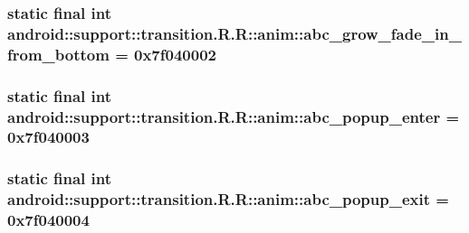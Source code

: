 \hypertarget{classandroid_1_1support_1_1transition_1_1_r_1_1anim_136cefce3ed4d59089d6ed7ee4d4d3c5}{
\subsubsection[{abc\_\-grow\_\-fade\_\-in\_\-from\_\-bottom}]{\setlength{\rightskip}{0pt plus 5cm}static final int android::support::transition.R.R::anim::abc\_\-grow\_\-fade\_\-in\_\-from\_\-bottom = 0x7f040002}}
\label{classandroid_1_1support_1_1transition_1_1_r_1_1anim_136cefce3ed4d59089d6ed7ee4d4d3c5}


\hypertarget{classandroid_1_1support_1_1transition_1_1_r_1_1anim_fc6bf81b3e7b4c875738a6c39d1cd4c3}{
\subsubsection[{abc\_\-popup\_\-enter}]{\setlength{\rightskip}{0pt plus 5cm}static final int android::support::transition.R.R::anim::abc\_\-popup\_\-enter = 0x7f040003}}
\label{classandroid_1_1support_1_1transition_1_1_r_1_1anim_fc6bf81b3e7b4c875738a6c39d1cd4c3}


\hypertarget{classandroid_1_1support_1_1transition_1_1_r_1_1anim_923620b48a44664f7870ecf6796086e9}{
\subsubsection[{abc\_\-popup\_\-exit}]{\setlength{\rightskip}{0pt plus 5cm}static final int android::support::transition.R.R::anim::abc\_\-popup\_\-exit = 0x7f040004}}
\label{classandroid_1_1support_1_1transition_1_1_r_1_1anim_923620b48a44664f7870ecf6796086e9}


